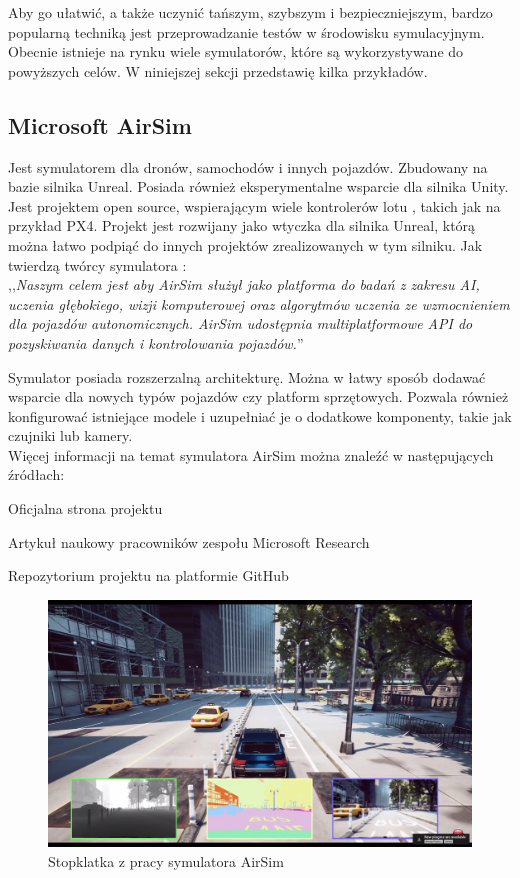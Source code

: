 Aby go ułatwić, a także uczynić tańszym, szybszym i bezpieczniejszym, bardzo popularną techniką jest przeprowadzanie testów w środowisku symulacyjnym. Obecnie istnieje na rynku wiele symulatorów, które są wykorzystywane do powyższych celów. W niniejszej sekcji przedstawię kilka przykładów.

\vspace{1cm}
\subsection{Microsoft AirSim}
Jest symulatorem dla dronów, samochodów i innych pojazdów. Zbudowany na bazie silnika Unreal. Posiada również eksperymentalne wsparcie dla silnika Unity. Jest projektem open source, wspierającym wiele kontrolerów lotu \cite{getfpv:flightControllers}, takich jak na przykład PX4. Projekt jest rozwijany jako wtyczka dla silnika Unreal, którą można łatwo podpiąć do innych projektów zrealizowanych w tym silniku. Jak twierdzą twórcy symulatora \cite{airsim:introducing}: \\
,,\textit{Naszym celem jest aby AirSim służył jako platforma do badań z zakresu AI, uczenia głębokiego, wizji komputerowej oraz algorytmów uczenia ze wzmocnieniem dla pojazdów autonomicznych. AirSim udostępnia multiplatformowe API do pozyskiwania danych i kontrolowania pojazdów.}''

Symulator posiada rozszerzalną architekturę. Można w łatwy sposób dodawać wsparcie dla nowych typów pojazdów czy platform sprzętowych. Pozwala również konfigurować istniejące modele i uzupełniać je o dodatkowe komponenty, takie jak czujniki lub kamery. \\
Więcej informacji na temat symulatora AirSim można znaleźć w następujących źródłach:
\begin{itemize*}
\item Oficjalna strona projektu \cite{airsim:website}
\item Artykuł naukowy pracowników zespołu Microsoft Research \cite{MSR-TR-2017-9}
\item Repozytorium projektu na platformie GitHub \cite{airsim:github}
\end{itemize*}

\newpage
\begin{figure}[H]
\centering
\includegraphics[width=16cm]{resources/figures/airsim_snapshot.png}
\caption{Stopklatka z pracy symulatora AirSim}
\label{AirSimSnapshot}
\end{figure}

